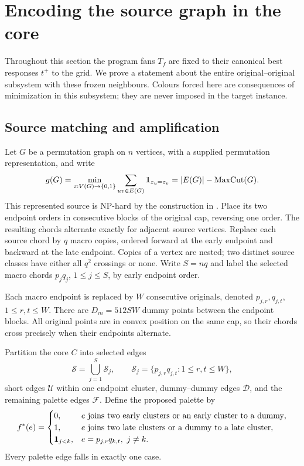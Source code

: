 \section{Encoding the source graph in the core}\label{sec:core}

Throughout this section the program fans $T_f$ are fixed to their canonical best responses $t^+$ to the grid. We prove a statement about the entire original--original subsystem with these frozen neighbours. Colours forced here are consequences of minimization in this subsystem; they are never imposed in the target instance.

\subsection{Source matching and amplification}
Let $G$ be a permutation graph on $n$ vertices, with a supplied permutation representation, and write
\[
g(G)=\min_{z:V(G)\to\{0,1\}}\sum_{uv\in E(G)}\mathbf 1_{z_u=z_v}
=|E(G)|-\operatorname{MaxCut}(G).
\]
This represented source is NP-hard by the construction in \cite{Figueiredo2023}. Place its two endpoint orders in consecutive blocks of the original cap, reversing one order. The resulting chords alternate exactly for adjacent source vertices. Replace each source chord by $q$ macro copies, ordered forward at the early endpoint and backward at the late endpoint. Copies of a vertex are nested; two distinct source classes have either all $q^2$ crossings or none. Write $S=nq$ and label the selected macro chords $p_jq_j$, $1\leq j\leq S$, by early endpoint order.

Each macro endpoint is replaced by $W$ consecutive originals, denoted $p_{j,r},q_{j,t}$, $1\leq r,t\leq W$. There are $D_m=512SW$ dummy points between the endpoint blocks. All original points are in convex position on the same cap, so their chords cross precisely when their endpoints alternate.

Partition the core $C$ into selected edges
\[
\mathcal S=\bigcup_{j=1}^S\mathcal S_j,\qquad
\mathcal S_j=\{p_{j,r}q_{j,t}:1\leq r,t\leq W\},
\]
short edges $\mathcal U$ within one endpoint cluster, dummy--dummy edges $\mathcal D$, and the remaining palette edges $\mathcal F$. Define the proposed palette by
\begin{equation}\label{eq:palette}
f^*(e)=
\begin{cases}
0,&e\text{ joins two early clusters or an early cluster to a dummy},\\
1,&e\text{ joins two late clusters or a dummy to a late cluster},\\
\mathbf 1_{j<k},&e=p_{j,r}q_{k,t},\ j\ne k.
\end{cases}
\end{equation}
Every palette edge falls in exactly one case.

